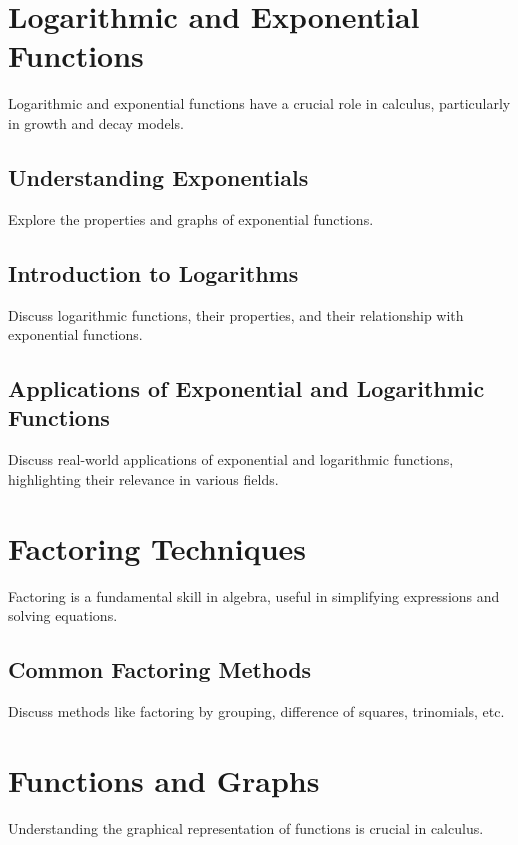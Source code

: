 \documentclass[a4paper,12pt]{book}
\begin{document}
\section{Logarithmic and Exponential Functions}
\label{sec:logarithmic_exponential}
Logarithmic and exponential functions have a crucial role in calculus, particularly in growth and decay models.


\subsection{Understanding Exponentials}
\label{subsec:understanding_exponentials}
Explore the properties and graphs of exponential functions.


\subsection{Introduction to Logarithms}
\label{subsec:introduction_to_logarithms}
Discuss logarithmic functions, their properties, and their relationship with exponential functions.


\subsection{Applications of Exponential and Logarithmic Functions}
\label{subsec:applications_exp_log_functions}
Discuss real-world applications of exponential and logarithmic functions, highlighting their relevance in various fields.


\section{Factoring Techniques}
\label{sec:factoring_techniques}
Factoring is a fundamental skill in algebra, useful in simplifying expressions and solving equations.


\subsection{Common Factoring Methods}
\label{subsec:common_factoring_methods}
Discuss methods like factoring by grouping, difference of squares, trinomials, etc.


\section{Functions and Graphs}
\label{sec:functions_and_graphs}
Understanding the graphical representation of functions is crucial in calculus.
\end{document}
